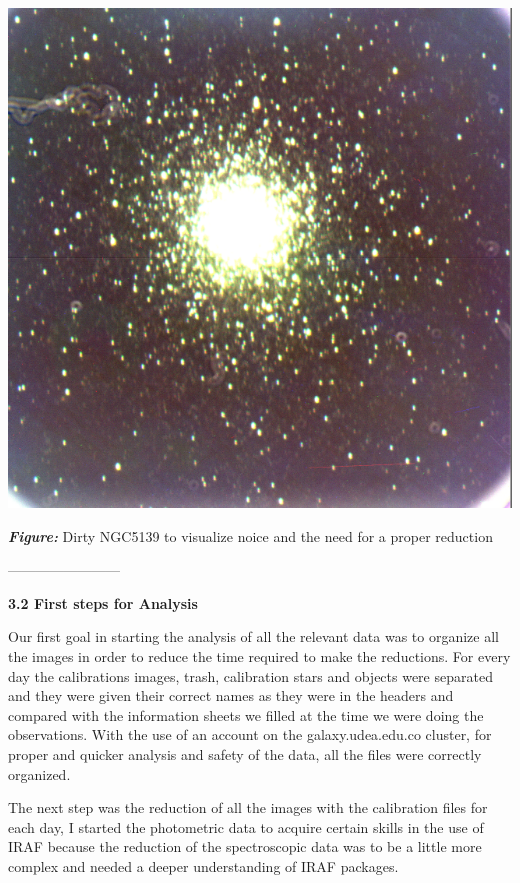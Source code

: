 \documentclass[english]{article}
\begin{document}
\begin{center}
\includegraphics[scale=0.5]{ngc_5139_dirty.png}

\textit{\textbf{Figure:}} Dirty NGC5139 to visualize noice and the need for a proper reduction
\end{center}
------------------------

\textbf{{\Large 3.2 First steps for Analysis}}

Our first goal in starting the analysis of all the relevant data was to organize all the images in order to reduce the time required to make the reductions. For every day the calibrations images, trash, calibration stars and objects were separated and they were given their correct names as they were in the headers and compared with the information sheets we filled at the time we were doing the observations. With the use of an account on the galaxy.udea.edu.co cluster, for proper and quicker analysis and safety of the data, all the files were correctly organized.

The next step was the reduction of all the images with the calibration files for each day, I started the photometric data to acquire certain skills in the use of IRAF because the reduction of the spectroscopic data was to be a little more complex and needed a deeper understanding of IRAF packages. 
\end{document}
